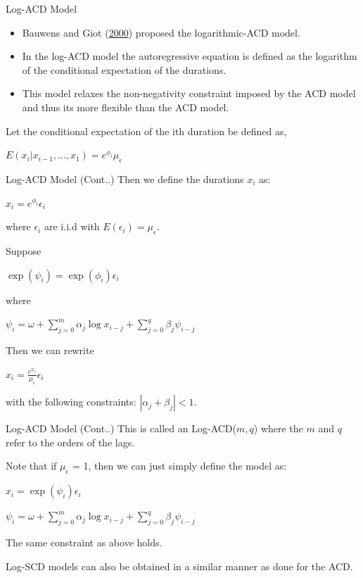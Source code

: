 \documentclass[
  ignorenonframetext,
]{beamer}
\begin{document}
\begin{frame}{Log-ACD Model}
\protect\hypertarget{log-acd-model}{}
\begin{itemize}
\item
  Bauwens and Giot (\protect\hyperlink{ref-LogACD}{2000}) proposed the
  logarithmic-ACD model.
\item
  In the log-ACD model the autoregressive equation is defined as the
  logarithm of the conditional expectation of the durations.
\item
  This model relaxes the non-negativity constraint imposed by the ACD
  model and thus its more flexible than the ACD model.
\end{itemize}

Let the conditional expectation of the ith duration be defined as,

\(E(x_i | x_{i-1}, ..., x_1) = e^{\phi_i} \mu_{\epsilon}\)
\end{frame}

\begin{frame}{Log-ACD Model (Cont..)}
\protect\hypertarget{log-acd-model-cont..}{}
Then we define the durations \(x_i\) as:

\(x_i = e^{\phi_i} \epsilon_i\)

where \(\epsilon_i\) are i.i.d with \(E(\epsilon_i)=\mu_{\epsilon}\).

Suppose

\(\exp(\psi_i) = \exp(\phi_i) \epsilon_i\)

where

\(\psi_i = \omega + \sum_{j=0}^m \alpha_j \log x_{i-j} + \sum_{j=0}^q \beta_j \psi_{i-j}\)

Then we can rewrite

\(x_i = \frac{e^{\psi_i}}{\mu_{\epsilon}} \epsilon_i\)

with the following constraints: \(|\alpha_j + \beta_j| < 1\).
\end{frame}

\begin{frame}{Log-ACD Model (Cont..)}
\protect\hypertarget{log-acd-model-cont..-1}{}
This is called an Log-ACD(\(m, q\)) where the \(m\) and \(q\) refer to
the orders of the lags.

Note that if \(\mu_{\epsilon}\) = 1, then we can just simply define the
model as:

\(x_i = \exp(\psi_i) \epsilon_i\)

\(\psi_i = \omega + \sum_{j=0}^m \alpha_j \log x_{i-j} + \sum_{j=0}^q \beta_j \psi_{i-j}\)

The same constraint as above holds.

Log-SCD models can also be obtained in a similar manner as done for the
ACD.
\end{frame}
\end{document}
